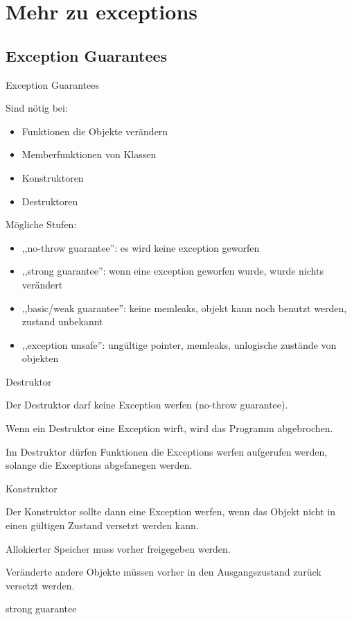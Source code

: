 \section{Mehr zu exceptions}


\subsection{Exception Guarantees}


\begin{frame}{Exception Guarantees}

    Sind nötig bei: 
	\begin{itemize}
		\item Funktionen die Objekte verändern
		\item Memberfunktionen von Klassen
		\item Konstruktoren
		\item Destruktoren
	\end{itemize}
	
	Mögliche Stufen:
	\begin{itemize}
			\item ,,no-throw guarantee'': es wird keine exception geworfen
			\item ,,strong guarantee'': wenn eine exception geworfen wurde, wurde nichts verändert
			\item ,,basic/weak guarantee'': keine memleaks, objekt kann noch benutzt werden, zustand unbekannt
			\item ,,exception unsafe'': ungültige pointer, memleaks, unlogische zustände von objekten
	\end{itemize}

\end{frame}


\begin{frame}{Destruktor}

    Der Destruktor darf keine Exception werfen (no-throw guarantee).
    
    Wenn ein Destruktor eine Exception wirft, wird das Programm abgebrochen.
    
    Im Destruktor dürfen Funktionen die Exceptions werfen aufgerufen werden, solange die Exceptions abgefanegen werden.

\end{frame}

\begin{frame}{Konstruktor}

    Der Konstruktor sollte dann eine Exception werfen, wenn das Objekt nicht in einen gültigen Zustand versetzt werden kann.
    
    Allokierter Speicher muss vorher freigegeben werden.
    
    Veränderte andere Objekte müssen vorher in den Ausgangszustand zurück versetzt werden.
    
    strong guarantee
    

\end{frame}

